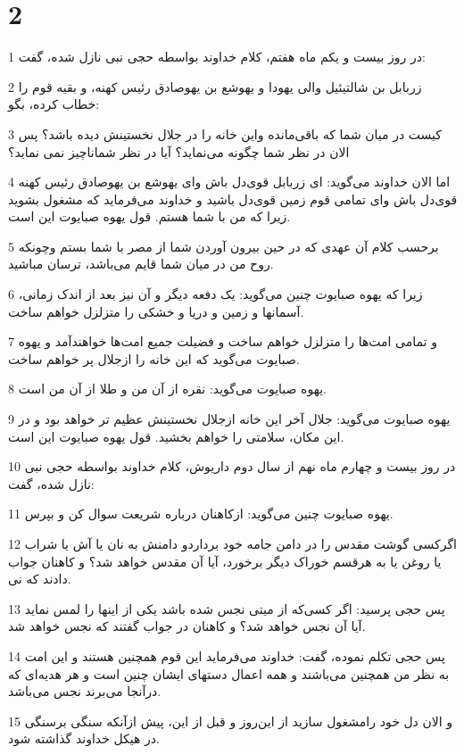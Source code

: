 \chapter{2}

\par 1 در روز بیست و یکم ماه هفتم، کلام خداوند بواسطه حجی نبی نازل شده، گفت:
\par 2 زربابل بن شالتیئیل والی یهودا و یهوشع بن یهوصادق رئیس کهنه، و بقیه قوم را خطاب کرده، بگو:
\par 3 کیست در میان شما که باقی‌مانده واین خانه را در جلال نخستینش دیده باشد؟ پس الان در نظر شما چگونه می‌نماید؟ آیا در نظر شماناچیز نمی نماید؟
\par 4 اما الان خداوند می‌گوید: ای زربابل قوی‌دل باش و‌ای یهوشع بن یهوصادق رئیس کهنه قوی‌دل باش و‌ای تمامی قوم زمین قوی‌دل باشید و خداوند می‌فرماید که مشغول بشوید زیرا که من با شما هستم. قول یهوه صبایوت این است.
\par 5 برحسب کلام آن عهدی که در حین بیرون آوردن شما از مصر با شما بستم وچونکه روح من در میان شما قایم می‌باشد، ترسان مباشید.
\par 6 زیرا که یهوه صبایوت چنین می‌گوید: یک دفعه دیگر و آن نیز بعد از اندک زمانی، آسمانها و زمین و دریا و خشکی را متزلزل خواهم ساخت.
\par 7 و تمامی امت‌ها را متزلزل خواهم ساخت و فضیلت جمیع امت‌ها خواهندآمد و یهوه صبایوت می‌گوید که این خانه را ازجلال پر خواهم ساخت.
\par 8 یهوه صبایوت می‌گوید: نقره از آن من و طلا از آن من است.
\par 9 یهوه صبایوت می‌گوید: جلال آخر این خانه ازجلال نخستینش عظیم تر خواهد بود و در این مکان، سلامتی را خواهم بخشید. قول یهوه صبایوت این است.
\par 10 در روز بیست و چهارم ماه نهم از سال دوم داریوش، کلام خداوند بواسطه حجی نبی نازل شده، گفت:
\par 11 یهوه صبایوت چنین می‌گوید: ازکاهنان درباره شریعت سوال کن و بپرس.
\par 12 اگرکسی گوشت مقدس را در دامن جامه خود برداردو دامنش به نان یا آش یا شراب یا روغن یا به هرقسم خوراک دیگر برخورد، آیا آن مقدس خواهد شد؟ و کاهنان جواب دادند که نی.
\par 13 پس حجی پرسید: اگر کسی‌که از میتی نجس شده باشد یکی از اینها را لمس نماید آیا آن نجس خواهد شد؟ و کاهنان در جواب گفتند که نجس خواهد شد.
\par 14 پس حجی تکلم نموده، گفت: خداوند می‌فرماید این قوم همچنین هستند و این امت به نظر من همچنین می‌باشند و همه اعمال دستهای ایشان چنین است و هر هدیه‌ای که درآنجا می‌برند نجس می‌باشد.
\par 15 و الان دل خود رامشغول سازید از این‌روز و قبل از این، پیش ازآنکه سنگی برسنگی در هیکل خداوند گذاشته شود.
